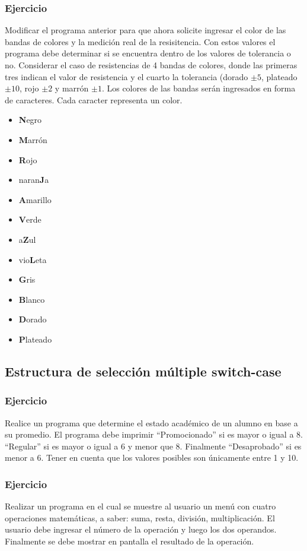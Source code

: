 \subsubsection{Ejercicio}
Modificar el programa anterior para que ahora solicite ingresar el color de las bandas de colores y la medición real de la resisitencia. Con estos valores el programa debe determinar si se encuentra dentro de los valores de tolerancia o no. Considerar el caso de resistencias de 4 bandas de colores, donde las primeras tres indican el valor de resistencia y el cuarto la tolerancia (dorado $ \pm 5 $, plateado $\pm 10$, rojo $\pm 2$ y marrón $\pm 1$. Los colores de las bandas serán ingresados en forma de caracteres. Cada caracter representa un color.
\begin{itemize}
  \item \textbf{N}egro
  \item \textbf{M}arrón
  \item \textbf{R}ojo
  \item naran\textbf{J}a
  \item \textbf{A}marillo
  \item \textbf{V}erde
  \item a\textbf{Z}ul
  \item vio\textbf{L}eta
  \item \textbf{G}ris
  \item \textbf{B}lanco
  \item \textbf{D}orado
  \item \textbf{P}lateado
  \end{itemize}
{\small
  \lstset{inputencoding=utf8/latin1}
  
}

\subsection*{Estructura de selección múltiple switch-case}
\subsubsection{Ejercicio}
Realice un programa que determine el estado académico de un alumno en base a su promedio. El programa debe imprimir ``Promocionado'' si es mayor o igual a 8. ``Regular'' si es mayor o igual a 6 y menor que 8. Finalmente ``Desaprobado'' si es menor a 6.
Tener en cuenta que los valores posibles son únicamente entre 1 y 10.

\subsubsection{Ejercicio}
Realizar un programa en el cual se muestre al usuario un menú con cuatro operaciones matemáticas, a saber: suma, resta, división, multiplicación. El usuario debe ingresar el número de la operación y luego los dos operandos. Finalmente se debe mostrar en pantalla el resultado de la operación.

